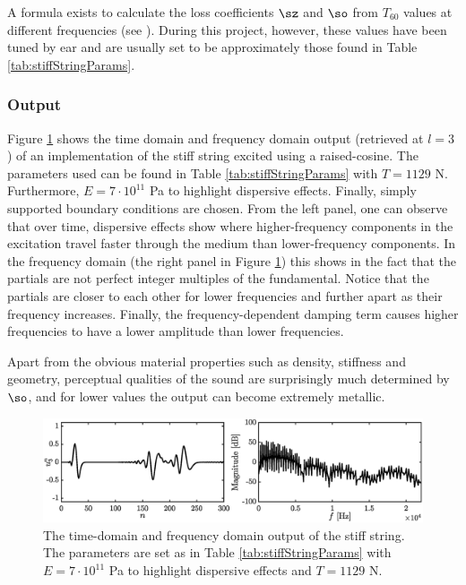 {\renewcommand{\arraystretch}{1}

A formula exists to calculate the loss coefficients $\sz$ and $\so$ from $T_{60}$ values at different frequencies (see \cite[Eq (7.29)]{theBible}). During this project, however, these values have been tuned by ear and are usually set to be approximately those found in Table \ref{tab:stiffStringParams}. 


\subsubsection{Output}
Figure \ref{fig:stiffStringOutput} shows the time domain and frequency domain output (retrieved at $l = 3$) of an implementation of the stiff string excited using a raised-cosine. The parameters used can be found in Table \ref{tab:stiffStringParams} 
with $T = 1129$ N. Furthermore, $E = 7\cdot 10^{11}$ Pa to highlight dispersive effects. Finally, simply supported boundary conditions are chosen. From the left panel, one can observe that over time, dispersive effects show where higher-frequency components in the excitation travel faster through the medium than lower-frequency components. In the frequency domain (the right panel in Figure \ref{fig:stiffStringOutput}) this shows in the fact that the partials are not perfect integer multiples of the fundamental. Notice that the partials are closer to each other for lower frequencies and further apart as their frequency increases. Finally, the frequency-dependent damping term causes higher frequencies to have a lower amplitude than lower frequencies. 

Apart from the obvious material properties such as density, stiffness and geometry, perceptual qualities of the sound are surprisingly much determined by $\so$, and for lower values the output can become extremely metallic.

\begin{figure}[h]
    \includegraphics[width=\textwidth]{figures/resonators/outputFFT.eps}
    \caption{The time-domain and frequency domain output of the stiff string. The parameters are set as in Table \ref{tab:stiffStringParams} with $E = 7\cdot 10^{11}$ Pa to highlight dispersive effects and $T = 1129$ N. %
    \label{fig:stiffStringOutput}}
\end{figure}


}
